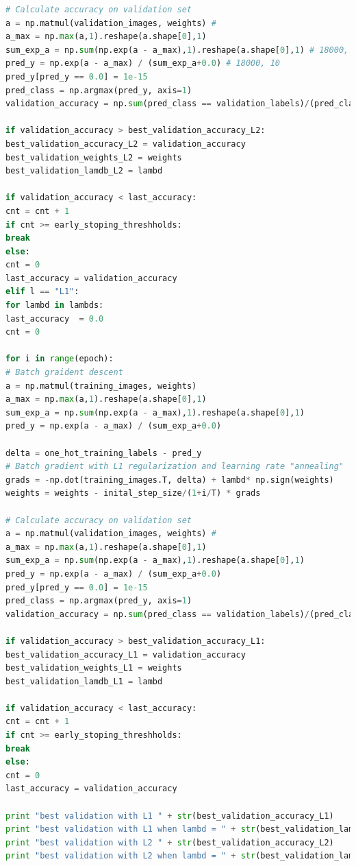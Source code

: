 \documentclass{article} %
\begin{document}
{\begin{lstlisting}[language=Python]
# Calculate accuracy on validation set
a = np.matmul(validation_images, weights) #
a_max = np.max(a,1).reshape(a.shape[0],1)
sum_exp_a = np.sum(np.exp(a - a_max),1).reshape(a.shape[0],1) # 18000, 1
pred_y = np.exp(a - a_max) / (sum_exp_a+0.0) # 18000, 10
pred_y[pred_y == 0.0] = 1e-15       
pred_class = np.argmax(pred_y, axis=1)
validation_accuracy = np.sum(pred_class == validation_labels)/(pred_class.shape[0]+0.0)

if validation_accuracy > best_validation_accuracy_L2:
best_validation_accuracy_L2 = validation_accuracy
best_validation_weights_L2 = weights
best_validation_lamdb_L2 = lambd

if validation_accuracy < last_accuracy:
cnt = cnt + 1
if cnt >= early_stoping_threshholds:
break
else:
cnt = 0
last_accuracy = validation_accuracy
elif l == "L1":
for lambd in lambds:
last_accuracy  = 0.0
cnt = 0

for i in range(epoch):
# Batch graident descent
a = np.matmul(training_images, weights)
a_max = np.max(a,1).reshape(a.shape[0],1)
sum_exp_a = np.sum(np.exp(a - a_max),1).reshape(a.shape[0],1)  
pred_y = np.exp(a - a_max) / (sum_exp_a+0.0) 

delta = one_hot_training_labels - pred_y 
# Batch gradient with L1 regularization and learning rate "annealing"
grads = -np.dot(training_images.T, delta) + lambd* np.sign(weights)
weights = weights - inital_step_size/(1+i/T) * grads

# Calculate accuracy on validation set
a = np.matmul(validation_images, weights) #
a_max = np.max(a,1).reshape(a.shape[0],1)
sum_exp_a = np.sum(np.exp(a - a_max),1).reshape(a.shape[0],1)
pred_y = np.exp(a - a_max) / (sum_exp_a+0.0) 
pred_y[pred_y == 0.0] = 1e-15       
pred_class = np.argmax(pred_y, axis=1)
validation_accuracy = np.sum(pred_class == validation_labels)/(pred_class.shape[0]+0.0)

if validation_accuracy > best_validation_accuracy_L1:
best_validation_accuracy_L1 = validation_accuracy
best_validation_weights_L1 = weights
best_validation_lamdb_L1 = lambd

if validation_accuracy < last_accuracy:
cnt = cnt + 1
if cnt >= early_stoping_threshholds:
break
else:
cnt = 0
last_accuracy = validation_accuracy

print "best validation with L1 " + str(best_validation_accuracy_L1)
print "best validation with L1 when lambd = " + str(best_validation_lamdb_L1)
print "best validation with L2 " + str(best_validation_accuracy_L2)
print "best validation with L2 when lambd = " + str(best_validation_lamdb_L2)


\end{lstlisting}}
\end{document}
